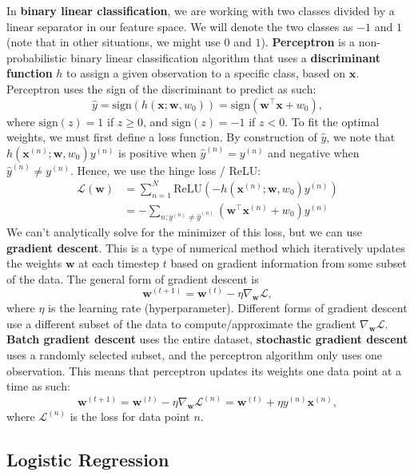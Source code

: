 \documentclass[11pt, letterpaper]{article}
\theoremstyle{definition}
\theoremstyle{plain}
\begin{document}
In \textbf{binary linear classification}, we are working with two classes divided by a linear separator in our feature space. We will denote the two classes as $-1$ and $1$ (note that in other situations, we might use $0$ and $1$). \textbf{Perceptron} is a non-probabilistic binary linear classification algorithm that uses a \textbf{discriminant function} $h$ to assign a given observation to a specific class, based on $\bm x$. Perceptron uses the sign of the discriminant to predict as such:
\[\hat{y} = \text{sign}(h(\bm x; \bm w, w_0)) = \text{sign}(\bm{w}^\top\bm{x} + w_0),\]
where $\text{sign}(z) = 1$ if $z \geq 0$, and $\text{sign}(z) = -1$ if $z < 0$.  To fit the optimal weights, we must first define a loss function. By construction of $\hat y$, we note that $h(\bm{x}^{(n)};\bm{w},w_0) y^{(n)}$ is positive when $\hat{y}^{(n)} = y^{(n)}$ and negative when $\hat{y}^{(n)} \ne y^{(n)}$. Hence, we use the hinge loss / ReLU:
\begin{align*}
   \mathcal{L}(\bm{w}) &=  \sum_{n=1}^N \text{ReLU}(-h(\bm{x}^{(n)};\bm{w},w_0) y^{(n)})  \\
    &=  -\sum_{n: y^{(n)} \neq \hat{y}^{(n)}} (\bm{w}^\top\bm{x}^{(n)} + w_0) y^{(n)}
\end{align*}
We can't analytically solve for the minimizer of this loss, but we can use \textbf{gradient descent}. This is a type of numerical method which iteratively updates the weights $\bm{w}$ at each timestep $t$ based on gradient information from some subset of the data. The general form of gradient descent is 
\[\bm{w}^{(t+1)} = \bm{w}^{(t)} - \eta \nabla_{\bm w}\mathcal{L},\]
where $\eta$ is the learning rate (hyperparameter). Different forms of gradient descent use a different subset of the data to compute/approximate the gradient $\nabla_{\bm w}\mathcal{L}$. \textbf{Batch gradient descent} uses the entire dataset, \textbf{stochastic gradient descent} uses a randomly selected subset, and the perceptron algorithm only uses one observation. This means that perceptron updates its weights one data point at a time as such:
\[
    \bm{w}^{(t+1)} = \bm{w}^{(t)} - \eta \nabla_{\bm w}\mathcal{L}^{(n)} = \bm{w}^{(t)} + \eta y^{(n)}\bm{x}^{(n)},
\]
where $\mathcal{L}^{(n)}$ is the loss for data point $n$. 

\subsection{Logistic Regression}
\end{document}
